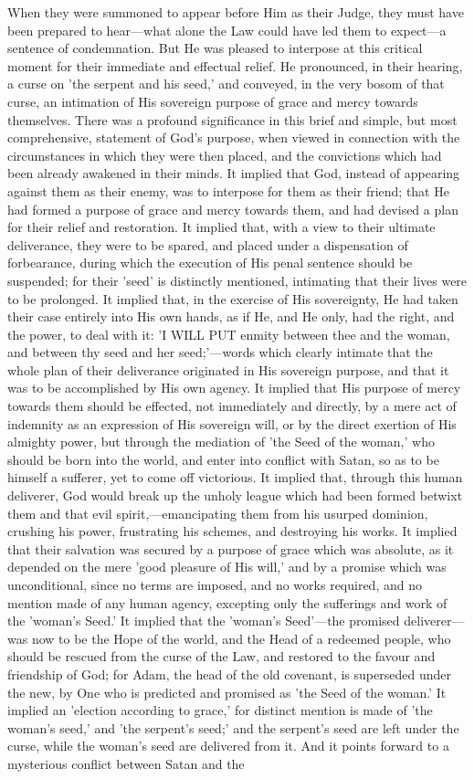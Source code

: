 \documentclass[
]{book}
\begin{document}
When they were summoned to appear before Him as their Judge, they must have been prepared to hear---what alone the Law could have led them to expect---a sentence of condemnation. But He was pleased to interpose at this critical moment for their immediate and effectual relief. He pronounced, in their hearing, a curse on 'the serpent and his seed,' and conveyed, in the very bosom of that curse, an intimation of His sovereign purpose of grace and mercy towards themselves. There was a profound significance in this brief and simple, but most comprehensive, statement of God's purpose, when viewed in connection with the circumstances in which they were then placed, and the convictions which had been already awakened in their minds. It implied that God, instead of appearing against them as their enemy, was to interpose for them as their friend; that He had formed a purpose of grace and mercy towards them, and had devised a plan for their relief and restoration. It implied that, with a view to their ultimate deliverance, they were to be spared, and placed under a dispensation of forbearance, during which the execution of His penal sentence should be suspended; for their 'seed' is distinctly mentioned, intimating that their lives were to be prolonged. It implied that, in the exercise of His sovereignty, He had taken their case entirely into His own hands, as if He, and He only, had the right, and the power, to deal with it: 'I WILL PUT enmity between thee and the woman, and between thy seed and her seed;'---words which clearly intimate that the whole plan of their deliverance originated in His sovereign purpose, and that it was to be accomplished by His own agency. It implied that His purpose of mercy towards them should be effected, not immediately and directly, by a mere act of indemnity as an expression of His sovereign will, or by the direct exertion of His almighty power, but through the mediation of 'the Seed of the woman,' who should be born into the world, and enter into conflict with Satan, so as to be himself a sufferer, yet to come off victorious. It implied that, through this human deliverer, God would break up the unholy league which had been formed betwixt them and that evil spirit,---emancipating them from his usurped dominion, crushing his power, frustrating his schemes, and destroying his works. It implied that their salvation was secured by a purpose of grace which was absolute, as it depended on the mere 'good pleasure of His will,' and by a promise which was unconditional, since no terms are imposed, and no works required, and no mention made of any human agency, excepting only the sufferings and work of the 'woman's Seed.' It implied that the 'woman's Seed'---the promised deliverer---was now to be the Hope of the world, and the Head of a redeemed people, who should be rescued from the curse of the Law, and restored to the favour and friendship of God; for Adam, the head of the old covenant, is superseded under the new, by One who is predicted and promised as 'the Seed of the woman.' It implied an 'election according to grace,' for distinct mention is made of 'the woman's seed,' and 'the serpent's seed;' and the serpent's seed are left under the curse, while the woman's seed are delivered from it. And it points forward to a mysterious conflict between Satan and the 
\end{document}
